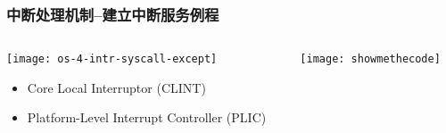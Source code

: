 \begin{frame}[plain,t]
	\frametitle{中断处理机制--建立中断服务例程}
	\begin{columns}
		
		\begin{column}{0.4\textwidth}
			\centering
			\texttt{[image: os-4-intr-syscall-except]}
			\begin{itemize} \small
				\item Core Local	Interruptor (CLINT)
				\item Platform-Level Interrupt Controller (PLIC)
			\end{itemize}
			
		\end{column}
		
		\begin{column}{0.6\textwidth}
			
			\centering
			
			\texttt{[image: showmethecode]}
			
%			
		\end{column}
		
	\end{columns}
	
\end{frame}


